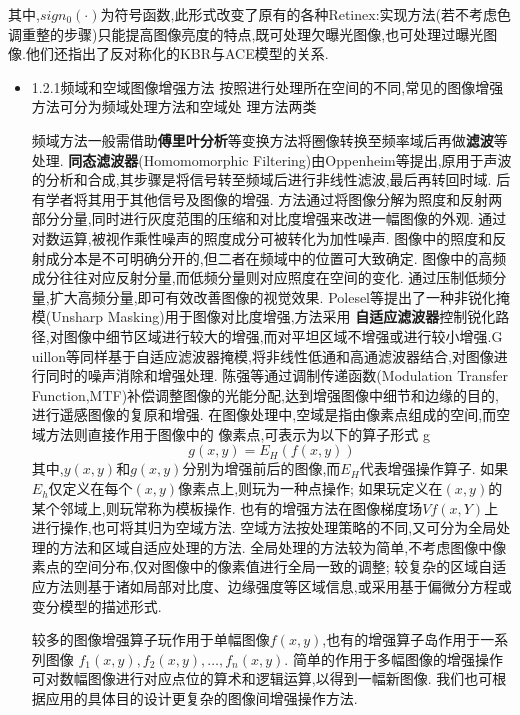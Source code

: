 \documentclass{amsart}
\begin{document}
其中,$sign_{0}(·)$为符号函数,此形式改变了原有的各种Retinex:实现方法(若不考虑色调重整的步骤)只能提高图像亮度的特点,既可处理欠曝光图像,也可处理过曝光图像.他们还指出了反对称化的KBR与ACE模型的关系.



\begin{itemize}
\item 1.2.1频域和空域图像增强方法
按照进行处理所在空间的不同,常见的图像增强方法可分为频域处理方法和空域处
理方法两类
\begin{itemize}
  频域方法一般需借助\textbf{傅里叶分析}等变换方法将圈像转换至频率域后再做\textbf{滤波}等处理.
\textbf{同态滤波器}(Homomomorphic Filtering)由Oppenheim等提出,原用于声波的分析和合成,其步骤是将信号转至频域后进行非线性滤波,最后再转回时域.
  后有学者将其用于其他信号及图像的增强.
  方法通过将图像分解为照度和反射两部分分量,同时进行灰度范围的压缩和对比度增强来改进一幅图像的外观.
  通过对数运算,被视作乘性噪声的照度成分可被转化为加性噪声.
  图像中的照度和反射成分本是不可明确分开的,但二者在频域中的位置可大致确定.
  图像中的高频成分往往对应反射分量,而低频分量则对应照度在空间的变化.
  通过压制低频分量,扩大高频分量,即可有效改善图像的视觉效果.
  Polesel等提出了一种非锐化掩模(Unsharp Masking)用于图像对比度增强,方法采用
  \textbf{自适应滤波器}控制锐化路径,对图像中细节区域进行较大的增强,而对平坦区域不增强或进行较小增强.G
  uillon等同样基于自适应滤波器掩模,将非线性低通和高通滤波器结合,对图像进行同时的噪声消除和增强处理.
  陈强等通过调制传递函数(Modulation Transfer Function,MTF)补偿调整图像的光能分配,达到增强图像中细节和边缘的目的,进行遥感图像的复原和增强.
在图像处理中,空域是指由像素点组成的空间,而空域方法则直接作用于图像中的
像素点,可表示为以下的算子形式
g
\begin{equation}
  \label{eq:10}
  g(x,y)=E_H(f(x,y))
\end{equation}
其中,$y(x,y)$和$g(x,y)$分别为增强前后的图像,而$E_H$代表增强操作算子.
如果$E_h$仅定义在每个$(x,y)$像素点上,则玩为一种点操作;
如果玩定义在$(x,y)$的某个邻域上,则玩常称为模板操作.
也有的增强方法在图像梯度场$Vf(x,Y)$上进行操作,也可将其归为空域方法.
空域方法按处理策略的不同,又可分为全局处理的方法和区域自适应处理的方法.
全局处理的方法较为简单,不考虑图像中像素点的空间分布,仅对图像中的像素值进行全局一致的调整;
较复杂的区域自适应方法则基于诸如局部对比度、边缘强度等区域信息,或采用基于偏微分方程或变分模型的描述形式.


较多的图像增强算子玩作用于单幅图像$f(x,y)$,也有的增强算子岛作用于一系列图像
$f_1(x,y),f_2(x,y),\dots,f_n(x,y)$.
简单的作用于多幅图像的增强操作可对数幅图像进行对应点位的算术和逻辑运算,以得到一幅新图像.
我们也可根据应用的具体目的设计更复杂的图像间增强操作方法.


\end{itemize}
\end{itemize}
\end{document}
